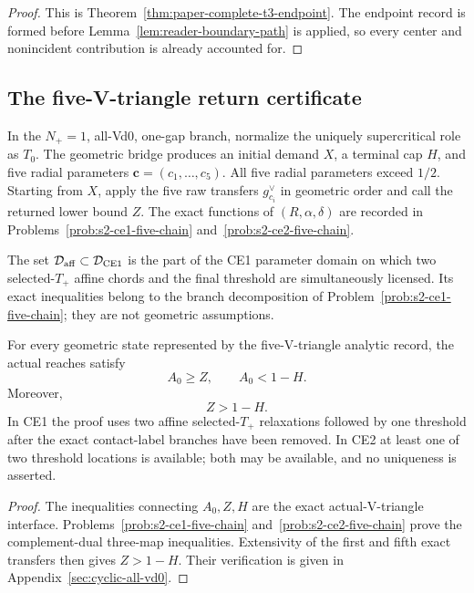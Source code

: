 \begin{proof}
This is Theorem~\ref{thm:paper-complete-t3-endpoint}.  The endpoint record is
formed before Lemma~\ref{lem:reader-boundary-path} is applied, so every center
and nonincident contribution is already accounted for.
\end{proof}

\subsection{The five-V-triangle return certificate}

\begin{definition}
\label{def:body-five-V-triangle-data}
In the $N_+=1$, all-Vd0, one-gap branch, normalize the uniquely
supercritical role as $T_0$.  The geometric bridge produces an initial demand
$X$, a terminal cap $H$, and five radial parameters
$\mathbf c=(c_1,\ldots,c_5)$.  All five radial parameters exceed $1/2$.  Starting from $X$, apply the five
raw transfers $g_{c_i}^\vee$ in geometric order and call the returned lower
bound $Z$.  The exact functions of $(R,\alpha,\delta)$ are recorded in
Problems~\ref{prob:s2-ce1-five-chain} and~\ref{prob:s2-ce2-five-chain}.
\end{definition}

\begin{definition}
\label{def:body-ce1-affine-domain}
The set $\mathcal D_{\rm aff}\subset\mathcal D_{\rm CE1}$ is the part of the
CE1 parameter domain on which two selected-$T_+$ affine chords and the final
threshold are simultaneously licensed.  Its exact inequalities belong to
the branch decomposition of Problem~\ref{prob:s2-ce1-five-chain}; they are
not geometric assumptions.
\end{definition}

\begin{proposition}
\label{prop:body-five-V-triangle-certificate}
For every geometric state represented by the five-V-triangle analytic record,
the actual reaches satisfy
\[
 A_0\ge Z,
 \qquad
 A_0<1-H.
\]
Moreover,
\[
 Z>1-H.
\]
In CE1 the proof uses two affine selected-$T_+$ relaxations followed by one
threshold after the exact contact-label branches have been removed.  In CE2
at least one of two threshold locations is available; both may be available,
and no uniqueness is asserted.
\end{proposition}

\begin{proof}
The inequalities connecting $A_0,Z,H$ are the exact actual-V-triangle
interface.  Problems~\ref{prob:s2-ce1-five-chain} and~\ref{prob:s2-ce2-five-chain}
prove the complement-dual three-map inequalities.  Extensivity of the first
and fifth exact transfers then gives $Z>1-H$.  Their verification is given in
Appendix~\ref{sec:cyclic-all-vd0}.
\end{proof}

